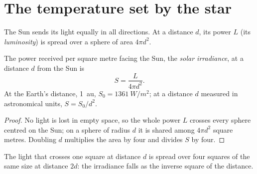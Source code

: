 \section{The temperature set by the star}

The Sun sends its light equally in all directions. At a distance $d$, its
power $L$ (its \emph{luminosity}) is spread over a sphere of area $4\pi d^2$.

\begin{proposition}\label{prop:g10:habitable-planet:inverse-square}
The power received per square metre facing the Sun, the \emph{solar
irradiance}, at a distance $d$ from the Sun is
\[
  S = \frac{L}{4\pi d^2}.
\]
At the Earth's distance, \qty{1}{au}, $S_0 = \qty{1361}{W/m^2}$; at a
distance $d$ measured in astronomical units, $S = S_0/d^2$.
\end{proposition}

\begin{proof}
No light is lost in empty space, so the whole power $L$ crosses every sphere
centred on the Sun; on a sphere of radius $d$ it is shared among $4\pi d^2$
square metres. Doubling $d$ multiplies the area by four and divides $S$ by
four.
\end{proof}

\begin{omfigure}

{\small The light that crosses one square at distance $d$ is spread over four
squares of the same size at distance $2d$: the irradiance falls as the
inverse square of the distance.}
\end{omfigure}

